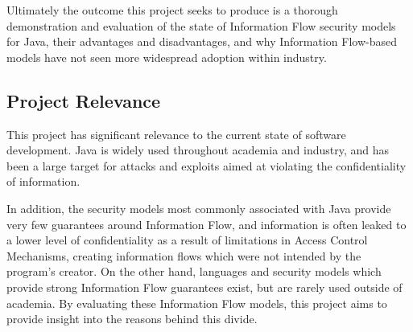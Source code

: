 Ultimately the outcome this project seeks to produce is a thorough demonstration and evaluation of the state of Information Flow security models for Java, their advantages and disadvantages, and why Information Flow-based models have not seen more widespread adoption within industry.

\subsection{Project Relevance}

This project has significant relevance to the current state of software development. Java is widely used throughout academia and industry, and has been a large target for attacks and exploits aimed at violating the confidentiality of information.

In addition, the security models most commonly associated with Java provide very few guarantees around Information Flow, and  information is often leaked to a lower level of confidentiality as a result of limitations in Access Control Mechanisms, creating information flows which were not intended by the program's creator. On the other hand, languages and security models which provide strong Information Flow guarantees exist, but are rarely used outside of academia. By evaluating these Information Flow models, this project aims to provide insight into the reasons behind this divide.